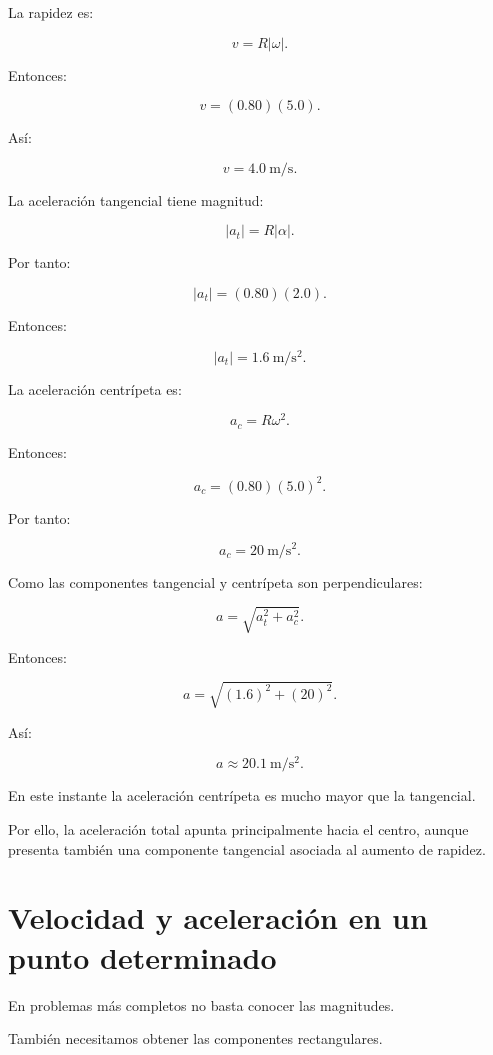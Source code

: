 La rapidez es:

\[
v=R|\omega|.
\]

Entonces:

\[
v
=
(0.80)(5.0).
\]

Así:

\[
\boxed{
v=\SI{4.0}{\meter\per\second}
}.
\]

La aceleración tangencial tiene magnitud:

\[
|a_t|=R|\alpha|.
\]

Por tanto:

\[
|a_t|
=
(0.80)(2.0).
\]

Entonces:

\[
\boxed{
|a_t|=\SI{1.6}{\meter\per\second\squared}
}.
\]

La aceleración centrípeta es:

\[
a_c=R\omega^2.
\]

Entonces:

\[
a_c
=
(0.80)(5.0)^2.
\]

Por tanto:

\[
\boxed{
a_c=\SI{20}{\meter\per\second\squared}
}.
\]

Como las componentes tangencial y centrípeta son perpendiculares:

\[
a
=
\sqrt{a_t^2+a_c^2}.
\]

Entonces:

\[
a
=
\sqrt{(1.6)^2+(20)^2}.
\]

Así:

\[
\boxed{
a\approx\SI{20.1}{\meter\per\second\squared}
}.
\]

\begin{interpretacion}

En este instante la aceleración centrípeta es mucho mayor que la tangencial.

Por ello, la aceleración total apunta principalmente hacia el centro, aunque
presenta también una componente tangencial asociada al aumento de rapidez.

\end{interpretacion}


\section{Velocidad y aceleración en un punto determinado}

En problemas más completos no basta conocer las magnitudes.

También necesitamos obtener las componentes rectangulares.

